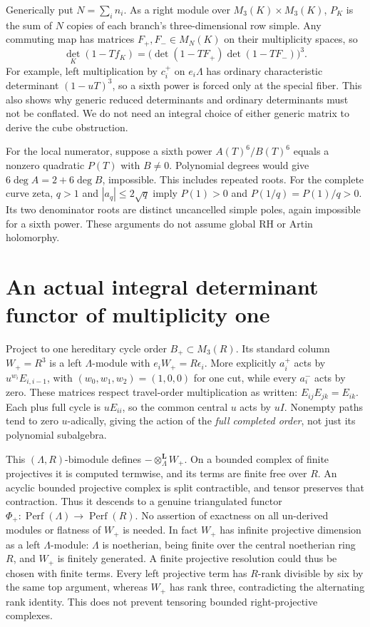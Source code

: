 \documentclass[11pt,oneside,openany]{book}
\theoremstyle{definition}\newtheorem{definition}[theorem]{Definition}
\theoremstyle{remark}\newtheorem{remark}[theorem]{Remark}
\begin{document}
Generically put $N=\sum_i n_i$. As a right module over $M_3(K)\times M_3(K)$, $P_K$ is the sum of $N$ copies of each branch's three-dimensional row simple. Any commuting map has matrices $F_+,F_-\in M_N(K)$ on their multiplicity spaces, so
\[
 \det_K(1-Tf_K)=\bigl(\det(1-TF_+)\det(1-TF_-)\bigr)^3.
\]
For example, left multiplication by $c_i^+$ on $e_i\Lambda$ has ordinary characteristic determinant $(1-uT)^3$, so a sixth power is forced only at the special fiber. This also shows why generic reduced determinants and ordinary determinants must not be conflated. We do not need an integral choice of either generic matrix to derive the cube obstruction.

For the local numerator, suppose a sixth power $A(T)^6/B(T)^6$ equals a nonzero quadratic $P(T)$ with $B\ne0$. Polynomial degrees would give $6\deg A=2+6\deg B$, impossible. This includes repeated roots. For the complete curve zeta, $q>1$ and $|a_q|\le2\sqrt q$ imply $P(1)>0$ and $P(1/q)=P(1)/q>0$. Its two denominator roots are distinct uncancelled simple poles, again impossible for a sixth power. These arguments do not assume global RH or Artin holomorphy.

\section{An actual integral determinant functor of multiplicity one}
Project to one hereditary cycle order $B_+\subset M_3(R)$. Its standard column $W_+=R^3$ is a left $\Lambda$-module with $e_iW_+=R\epsilon_i$. More explicitly $a_i^+$ acts by $u^{w_i}E_{i,i-1}$, with $(w_0,w_1,w_2)=(1,0,0)$ for one cut, while every $a_i^-$ acts by zero. These matrices respect travel-order multiplication as written: $E_{ij}E_{jk}=E_{ik}$. Each plus full cycle is $uE_{ii}$, so the common central $u$ acts by $uI$. Nonempty paths tend to zero $u$-adically, giving the action of the \emph{full completed order}, not just its polynomial subalgebra.

This $(\Lambda,R)$-bimodule defines $-\otimes_\Lambda^{\mathbf L}W_+$. On a bounded complex of finite projectives it is computed termwise, and its terms are finite free over $R$. An acyclic bounded projective complex is split contractible, and tensor preserves that contraction. Thus it descends to a genuine triangulated functor $\Phi_+:\operatorname{Perf}(\Lambda)\to\operatorname{Perf}(R)$. No assertion of exactness on all un-derived modules or flatness of $W_+$ is needed. In fact $W_+$ has infinite projective dimension as a left $\Lambda$-module: $\Lambda$ is noetherian, being finite over the central noetherian ring $R$, and $W_+$ is finitely generated. A finite projective resolution could thus be chosen with finite terms. Every left projective term has $R$-rank divisible by six by the same top argument, whereas $W_+$ has rank three, contradicting the alternating rank identity. This does not prevent tensoring bounded right-projective complexes.
\end{document}

